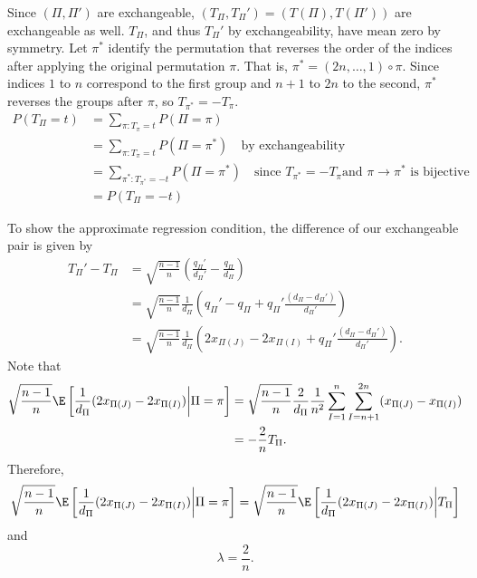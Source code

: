 Since $(\Pi, \Pi')$ are exchangeable, $(T_{\Pi}, T_{\Pi}') = (T(\Pi), T(\Pi'))$ are exchangeable as
well.  $T_{\Pi}$, and thus $T_{\Pi}'$ by exchangeability, have mean zero by symmetry.  Let $\pi^*$ identify
the permutation that reverses the order of the indices after applying the original permutation
$\pi$.  That is, $\pi^* = (2n, \ldots, 1) \circ \pi$.  Since indices $1$ to $n$ correspond to the
first group and $n+1$ to $2n$ to the second, $\pi^*$ reverses the groups after $\pi$, so $T_{\pi^*} =
-T_{\pi}$.
\begin{align*}
  P(T_{\Pi} = t) &= \sum_{\pi : T_{\pi} = t} P(\Pi = \pi) \\
  &= \sum_{\pi : T_{\pi} = t} P(\Pi = \pi^*) \quad \text{by exchangeability} \\
  &= \sum_{\pi^* : T_{\pi^*} = -t} P(\Pi = \pi^*) \quad \text{since } T_{\pi^*} = -T_{\pi} \text{
    and } \pi \to \pi^* \text{ is bijective} \\
  &= P(T_{\Pi} = -t)
\end{align*}

To show the approximate regression condition, the difference of our exchangeable pair is given by
\begin{align}
  T_{\Pi}' - T_{\Pi}
  &= \sqrt{\frac{n-1}{n}}\left (\frac{q_{\Pi}'}{d_{\Pi}'}-\frac{q_{\Pi}}{d_{\Pi}}\right )
  \nonumber \\
  &= \sqrt{\frac{n-1}{n}}\frac{1}{d_{\Pi}}\left (q_{\Pi}' - q_{\Pi} +
    q_{\Pi}' \frac{(d_{\Pi}-d_{\Pi}')}{d_{\Pi}'}\right ) \nonumber \\
  &= \sqrt{\frac{n-1}{n}}\frac{1}{d_{\Pi}}\left
    (2x_{\Pi(J)} - 2x_{\Pi(I)} + q_{\Pi}' \frac{(d_{\Pi}-d_{\Pi}')}{d_{\Pi}'}\right ). \label{def:ttpcubed}
\end{align}
Note that
\begin{align*}
  \sqrt{\frac{n-1}{n}} \E \left [ \frac{1}{d_{\Pi}} (2x_{\Pi(J)} - 2x_{\Pi(I)}) \middle | \Pi = \pi \right ]
  &= \sqrt{\frac{n-1}{n}} \frac{2}{d_{\Pi}} \frac{1}{n^2} \sum_{I=1}^n \sum_{I=n+1}^{2n} (x_{\Pi(J)}-x_{\Pi(I)}) \\
  &= -\frac{2}{n} T_{\Pi}.
\end{align*}
Therefore,
\begin{equation*}
  \sqrt{\frac{n-1}{n}} \E \left [ \frac{1}{d_{\Pi}} (2x_{\Pi(J)} - 2x_{\Pi(I)}) \middle | \Pi = \pi \right ]
  = \sqrt{\frac{n-1}{n}} \E \left [ \frac{1}{d_{\Pi}} (2x_{\Pi(J)} - 2x_{\Pi(I)}) \middle | T_{\Pi} \right ]
\end{equation*}
and
\begin{equation*}
  \lambda = \frac{2}{n}.
\end{equation*}

